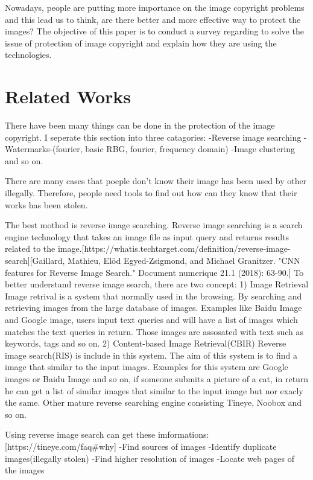 Nowadays, people are putting more importance on the image copyright problems and this lead us to think,
are there better and more effective way to protect the images?
The objective of this paper is to conduct a survey regarding to solve the issue of protection of image copyright and explain how they are using the technologies.

\section{Related Works}
There have been many things can be done in the protection of the image copyright. 
I seperate this section into three catagories: 
-Reverse image searching
-Watermarks-(fourier, basic RBG, fourier, frequency domain)
-Image clustering and so on.

There are many cases that poeple don't know their image has been used by other illegally.
Therefore, people need tools to find out how can they know that their works has been stolen.

The best mothod is reverse image searching.
Reverse image searching is a search engine technology that takes an image file as input query and returns results related to the image.[https://whatis.techtarget.com/definition/reverse-image-search][Gaillard, Mathieu, Elöd Egyed-Zsigmond, and Michael Granitzer. "CNN features for Reverse Image Search." Document numerique 21.1 (2018): 63-90.]
To better understand reverse image search, there are two concept:
1) Image Retrieval
Image retrival is a system that normally used in the browsing.
By searching and retrieving images from the large database of images.
Examples like Baidu Image and Google image, users input text queries and will have a list of images which matches the text queries in return.
Those images are assosated with text such as keywords, tags and so on.
2) Content-based Image Retrieval(CBIR)
Reverse image search(RIS) is include in this system.
The aim of this system is to find a image that similar to the input images.
Examples for this system are Google images or Baidu Image and so on,
if someone submits a picture of a cat, in return he can get a list of similar images that similar to the input image but nor exacly the same.
Other mature reverse searching engine consisting Tineye, Noobox and so on.

Using reverse image search can get these imformations:[https://tineye.com/faq#why]
-Find sources of images
-Identify duplicate images(illegally stolen)
-Find higher resolution of images
-Locate web pages of the images

